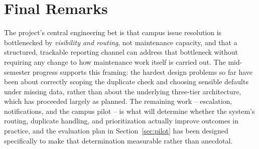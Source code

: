 \documentclass[11pt]{report}
\begin{document}
\section{Final Remarks}

The project's central engineering bet is that campus issue resolution is
bottlenecked by \emph{visibility and routing}, not maintenance capacity,
and that a structured, trackable reporting channel can address that
bottleneck without requiring any change to how maintenance work itself
is carried out. The mid-semester progress supports this framing: the
hardest design problems so far have been about correctly scoping the
duplicate check and choosing sensible defaults under missing data,
rather than about the underlying three-tier architecture, which has
proceeded largely as planned. The remaining work -- escalation,
notifications, and the campus pilot -- is what will determine whether
the system's routing, duplicate handling, and prioritization actually
improve outcomes in practice, and the evaluation plan in
Section~\ref{sec:pilot} has been designed specifically to make that
determination measurable rather than anecdotal.
\end{document}
